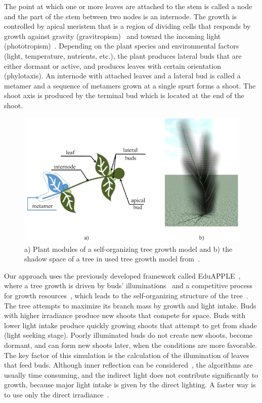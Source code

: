 The point at which one or more leaves are attached to the stem is called a node and the part of the stem between two nodes is an internode. 
The growth is controlled by apical meristem that is a region of dividing cells that responds by growth against gravity (gravitropism)~\cite{Berut201801895} and
toward the incoming light (phototropism)~\cite{mech_visual_1996}.
Depending on the plant species and environmental factors (light, temperature, nutrients, etc.), the plant produces lateral buds that are either dormant or active, and produces leaves with certain orientation (phylotaxis).
An internode with attached leaves and a lateral bud is called a metamer and a sequence of metamers grown at a single spurt forms a shoot. 
The shoot axis is produced by the terminal bud which is located at the end of the shoot.
\begin{figure}[hbt]
    \centering
    \includegraphics[width=\linewidth]{figs/Fig1}
    \caption{a) Plant modules of a self-organizing tree growth
model and b) the shadow space of a tree in used tree growth model from~\cite{kohek_eduapple:_2015}.}
    \label{fig:my_figure1}
\end{figure}

Our approach uses the previously developed framework called EduAPPLE~\cite{kohek_eduapple:_2015},
where a tree growth is driven by buds' illuminations~\cite{benes_efficient_1996,benes_visual_1997,mech_visual_1996} and a competitive process for growth resources~\cite{alsweis_modeling_2005,arvo_modeling_1988,palubicki_self-organizing_2009,runions_modeling_2007}, which leads to the self-organizing structure of the tree~\cite{palubicki_self-organizing_2009}. 
The tree attempts to maximize its branch mass by growth and light intake. Buds with higher irradiance produce new shoots that compete for space. Buds with lower light intake produce quickly growing shoots
that attempt to get from shade (light seeking stage). Poorly illuminated buds do not create new shoots, become dormant, and can form new shoots later, when the conditions are more favorable. The key factor of this simulation is the calculation of the illumination of leaves that feed buds. Although inner reflection can be considered~\cite{soler_efficient_2003},
the algorithms are usually time consuming, and the indirect light does
not contribute significantly to growth, because major light intake is
given by the direct lighting. A faster way is to use only the direct
irradiance~\cite{benes_efficient_1996,benes_visual_1997,mech_visual_1996,pirk_plastic_2012}. 


